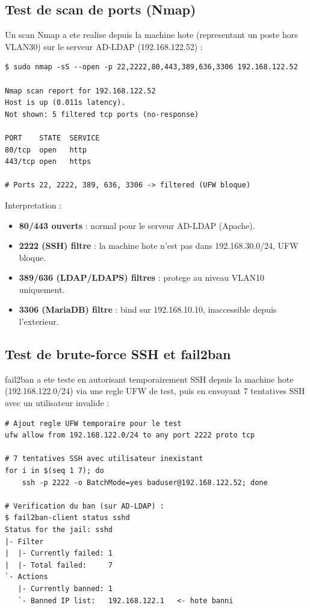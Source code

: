 \documentclass[11pt,a4paper]{article}
\begin{document}
\subsection{Test de scan de ports (Nmap)}

Un scan Nmap a ete realise depuis la machine hote (representant un poste hors VLAN30) sur le serveur AD-LDAP (192.168.122.52) :

\begin{lstlisting}[caption={Scan Nmap sur AD-LDAP -- resultat reel}]
$ sudo nmap -sS --open -p 22,2222,80,443,389,636,3306 192.168.122.52

Nmap scan report for 192.168.122.52
Host is up (0.011s latency).
Not shown: 5 filtered tcp ports (no-response)

PORT    STATE  SERVICE
80/tcp  open   http
443/tcp open   https

# Ports 22, 2222, 389, 636, 3306 -> filtered (UFW bloque)
\end{lstlisting}

Interpretation :
\begin{itemize}[noitemsep,leftmargin=1.4em]
  \item \textbf{80/443 ouverts} : normal pour le serveur AD-LDAP (Apache).
  \item \textbf{2222 (SSH) filtre} : la machine hote n'est pas dans 192.168.30.0/24, UFW bloque.
  \item \textbf{389/636 (LDAP/LDAPS) filtres} : protege au niveau VLAN10 uniquement.
  \item \textbf{3306 (MariaDB) filtre} : bind sur 192.168.10.10, inaccessible depuis l'exterieur.
\end{itemize}

\subsection{Test de brute-force SSH et fail2ban}

fail2ban a ete teste en autorisant temporairement SSH depuis la machine hote (192.168.122.0/24) via une regle UFW de test, puis en envoyant 7 tentatives SSH avec un utilisateur invalide :

\begin{lstlisting}[caption={Test fail2ban -- resultat reel}]
# Ajout regle UFW temporaire pour le test
ufw allow from 192.168.122.0/24 to any port 2222 proto tcp

# 7 tentatives SSH avec utilisateur inexistant
for i in $(seq 1 7); do
    ssh -p 2222 -o BatchMode=yes baduser@192.168.122.52; done

# Verification du ban (sur AD-LDAP) :
$ fail2ban-client status sshd
Status for the jail: sshd
|- Filter
|  |- Currently failed: 1
|  |- Total failed:     7
`- Actions
   |- Currently banned: 1
   `- Banned IP list:   192.168.122.1   <- hote banni
\end{lstlisting}
\end{document}
